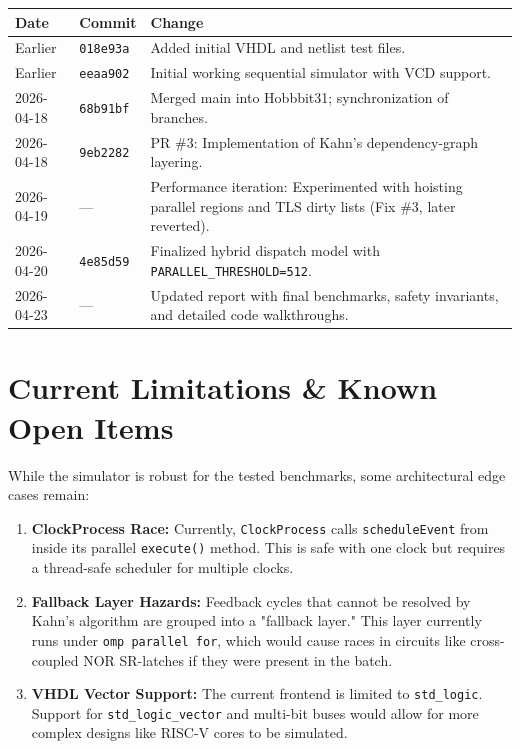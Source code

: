 \documentclass[9pt,a4paper]{article}
\begin{document}
\begin{longtable}{@{}p{2.2cm}p{2.6cm}p{10cm}@{}}
\toprule
\textbf{Date} & \textbf{Commit} & \textbf{Change} \\
\midrule \endhead
Earlier       & \texttt{018e93a} & Added initial VHDL and netlist test files. \\
Earlier       & \texttt{eeaa902} & Initial working sequential simulator with VCD support. \\
2026-04-18    & \texttt{68b91bf} & Merged main into Hobbbit31; synchronization of branches. \\
2026-04-18    & \texttt{9eb2282} & PR \#3: Implementation of Kahn's dependency-graph layering. \\
2026-04-19    & ---               & Performance iteration: Experimented with hoisting parallel regions and TLS dirty lists (Fix \#3, later reverted). \\
2026-04-20    & \texttt{4e85d59} & Finalized hybrid dispatch model with \texttt{PARALLEL\_THRESHOLD=512}. \\
2026-04-23    & ---               & Updated report with final benchmarks, safety invariants, and detailed code walkthroughs. \\
\bottomrule
\end{longtable}

\section{Current Limitations \& Known Open Items}
While the simulator is robust for the tested benchmarks, some architectural edge cases remain:
\begin{enumerate}
    \item \textbf{ClockProcess Race:} Currently, \texttt{ClockProcess} calls \texttt{scheduleEvent} from inside its parallel \texttt{execute()} method. This is safe with one clock but requires a thread-safe scheduler for multiple clocks.
    \item \textbf{Fallback Layer Hazards:} Feedback cycles that cannot be resolved by Kahn's algorithm are grouped into a "fallback layer." This layer currently runs under \texttt{omp parallel for}, which would cause races in circuits like cross-coupled NOR SR-latches if they were present in the batch.
    \item \textbf{VHDL Vector Support:} The current frontend is limited to \texttt{std\_logic}. Support for \texttt{std\_logic\_vector} and multi-bit buses would allow for more complex designs like RISC-V cores to be simulated.
\end{enumerate}
\end{document}
